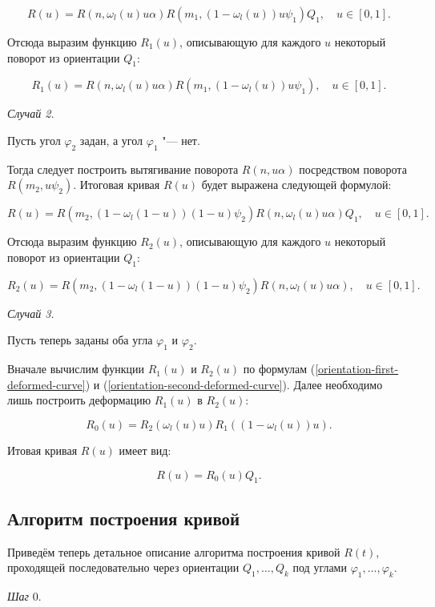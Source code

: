 $$
R(u)=R(n,\omega_l(u)u\alpha)R(m_1,(1-\omega_l(u))u\psi_1)Q_1, \quad u \in [0,1].
$$

Отсюда выразим функцию $R_1(u)$, описывающую для каждого $u$ некоторый поворот из ориентации $Q_1$:

\begin{equation}
R_1(u)=R(n,\omega_l(u)u\alpha)R(m_1,(1-\omega_l(u))u\psi_1), \quad u \in [0,1].
\label{orientation-first-deformed-curve}
\end{equation}

\bigskip
\textit{Случай 2.}

Пусть угол $\varphi_2$ задан, а угол $\varphi_1$ "--- нет.

Тогда следует построить вытягивание поворота $R(n,u\alpha)$ посредством поворота $R(m_2,u\psi_2)$. Итоговая кривая
$R(u)$ будет выражена следующей формулой:

$$
R(u)=R(m_2,(1-\omega_l(1-u))(1-u)\psi_2)R(n,\omega_l(u)u\alpha)Q_1, \quad u \in [0,1].
$$

Отсюда выразим функцию $R_2(u)$, описывающую для каждого $u$ некоторый поворот из ориентации $Q_1$:

\begin{equation}
R_2(u)=R(m_2,(1-\omega_l(1-u))(1-u)\psi_2)R(n,\omega_l(u)u\alpha), \quad u \in [0,1].
\label{orientation-second-deformed-curve}
\end{equation}

\bigskip
\textit{Случай 3.}

Пусть теперь заданы оба угла $\varphi_1$ и $\varphi_2$.

Вначале вычислим функции $R_1(u)$ и $R_2(u)$ по формулам (\ref{orientation-first-deformed-curve}) и
(\ref{orientation-second-deformed-curve}). Далее необходимо лишь построить деформацию $R_1(u)$ в $R_2(u)$:

$$
R_0(u)=R_2(\omega_l(u)u)R_1((1-\omega_l(u))u).
$$

Итовая кривая $R(u)$ имеет вид:

$$
R(u)=R_0(u)Q_1.
$$

\subsection*{Алгоритм построения кривой}

Приведём теперь детальное описание алгоритма построения кривой $R(t)$, проходящей последовательно через ориентации
$Q_1,\dots,Q_k$ под углами $\varphi_1,\dots,\varphi_k$.

\bigskip
\textit{Шаг} 0.


